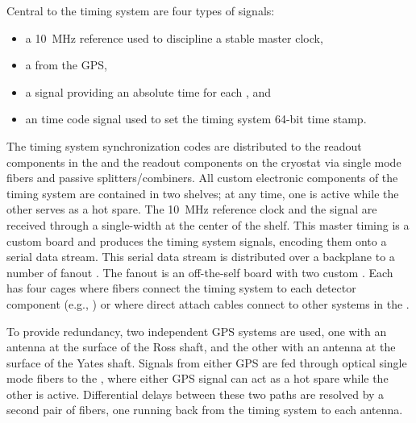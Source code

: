 Central to the timing system are four types of signals:
\begin{itemize}
\item a \SI{10}{\mega\hertz} reference used to discipline a stable master clock,
\item a  from the GPS,
\item a  signal providing an absolute time for each , and
\item an  time code signal
  used to set the timing system 64-bit time stamp.
\end{itemize}

The timing system synchronization codes are distributed to the  readout components in the  and the readout components on the cryostat via single mode fibers and passive splitters/combiners.
All custom electronic components of the timing system are contained in two  shelves; at any time, one is active while the other serves as a hot spare.
The \SI{10}{MHz} reference clock and the  signal are received through a single-width  at the center of the  shelf.
This master timing  is a custom board and produces the timing system signals, encoding them onto a serial data stream.
This serial data stream is distributed over a backplane to a number of fanout .
The fanout  is an off-the-self board with two custom .
Each  has four  cages where fibers connect the timing system to each detector component (e.g., ) or where direct attach cables connect to other systems in the .

To provide redundancy, two independent GPS systems are used,
one with an antenna at the surface of the Ross shaft, and the other
with an antenna at the surface of the Yates shaft. Signals from either
GPS are fed through optical single mode fibers to the , where
either GPS signal can act as a hot spare while the other is active. 
Differential delays between these two paths are resolved by a second pair of fibers, one running back from the timing system to each antenna.



